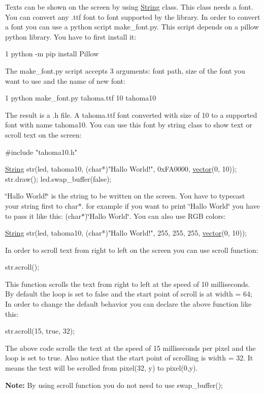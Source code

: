Texts can be shown on the screen by using \hyperlink{class_string}{String} class. This class needs a font. You can convert any .ttf font to font supported by the library. In order to convert a font you can use a python script make\+\_\+font.\+py. This script depends on a pillow python library. You have to first install it\+: 
\begin{DoxyCode}
1 python -m pip install Pillow
\end{DoxyCode}
 The make\+\_\+font.\+py script accepts 3 arguments\+: font path, size of the font you want to use and the name of new font\+: 
\begin{DoxyCode}
1 python make\_font.py tahoma.ttf 10 tahoma10
\end{DoxyCode}
 The result is a .h file. A tahoma.\+ttf font converted with size of 10 to a supported font with name tahoma10. You can use this font by string class to show text or scroll text on the screen\+: 
\begin{DoxyCode}
\textcolor{preprocessor}{#include "tahoma10.h"}

\hyperlink{class_string}{String} str(led, tahoma10, (\textcolor{keywordtype}{char}*)\textcolor{stringliteral}{"Hallo World!"}, 0xFA0000, \hyperlink{classvector}{vector}(0, 10));
str.draw();
led.swap\_buffer(\textcolor{keyword}{false});
\end{DoxyCode}
 \char`\"{}\+Hallo World!\char`\"{} is the string to be written on the screen. You have to typecast your string first to char$\ast$. for example if you want to print \char`\"{}\+Hallo World\char`\"{} you have to pass it like this\+: (char$\ast$)\char`\"{}\+Hallo World\char`\"{}. You can also use R\+GB colors\+: 
\begin{DoxyCode}
\hyperlink{class_string}{String} str(led, tahoma10, (\textcolor{keywordtype}{char}*)\textcolor{stringliteral}{"Hallo World!"}, 255, 255, 255, \hyperlink{classvector}{vector}(0, 10));
\end{DoxyCode}


In order to scroll text from right to left on the screen you can use scroll function\+: 
\begin{DoxyCode}
str.scroll();
\end{DoxyCode}
 This function scrolls the text from right to left at the speed of 10 milliseconds. By default the loop is set to false and the start point of scroll is at width = 64; In order to change the default behavior you can declare the above function like this\+: 
\begin{DoxyCode}
str.scroll(15, \textcolor{keyword}{true}, 32);
\end{DoxyCode}
 The above code scrolls the text at the speed of 15 milliseconds per pixel and the loop is set to true. Also notice that the start point of scrolling is width = 32. It means the text will be scrolled from pixel(32, y) to pixel(0,y).

{\bfseries Note\+:} By using scroll function you do not need to use swap\+\_\+buffer(); 